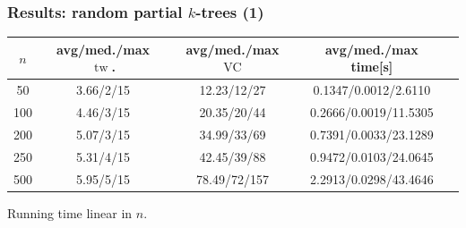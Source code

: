\documentclass[11pt]{beamer}
\DeclareMathOperator{\tw}{tw}
\DeclareMathOperator{\VC}{VC}
\begin{document}
\begin{frame}
\frametitle{Results: random partial $k$-trees (1)}

\begin{center}
\footnotesize
\begin{table}[h!]
\centering
\begin{tabular}{|c|c|c|c|c|}
\hline
$n$ & avg/med./max $\tw$. & avg/med./max $\VC$ & avg/med./max time[s] \\
\hline \hline
50 & 3.66/2/15 & 12.23/12/27 & 0.1347/0.0012/2.6110 \\
\hline
100 & 4.46/3/15 & 20.35/20/44 & 0.2666/0.0019/11.5305 \\
\hline
200 & 5.07/3/15 & 34.99/33/69 & 0.7391/0.0033/23.1289 \\
\hline
250 & 5.31/4/15 & 42.45/39/88 & 0.9472/0.0103/24.0645 \\
\hline
500 & 5.95/5/15 & 78.49/72/157 & 2.2913/0.0298/43.4646 \\
\hline
\end{tabular}
\end{table}
\end{center}

Running time linear in $n$.

\end{frame}
\end{document}
